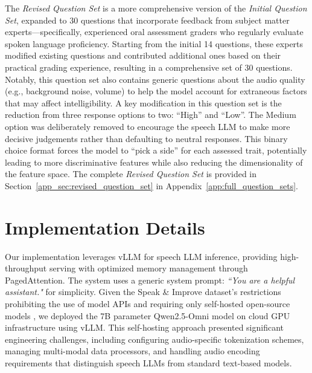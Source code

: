 \documentclass{report}
\begin{document}
The \emph{Revised Question Set} is a more comprehensive version of the \emph{Initial Question Set}, expanded to 30 questions that incorporate feedback from subject matter experts—specifically, experienced oral assessment graders who regularly evaluate spoken language proficiency. Starting from the initial 14 questions, these experts modified existing questions and contributed additional ones based on their practical grading experience, resulting in a comprehensive set of 30 questions. Notably, this question set also contains generic questions about the audio quality (e.g., background noise, volume) to help the model account for extraneous factors that may affect intelligibility. A key modification in this question set is the reduction from three response options to two: ``High'' and ``Low''. The Medium option was deliberately removed to encourage the speech LLM to make more decisive judgements rather than defaulting to neutral responses. This binary choice format forces the model to ``pick a side'' for each assessed trait, potentially leading to more discriminative features while also reducing the dimensionality of the feature space. The complete \emph{Revised Question Set} is provided in Section~\ref{app_sec:revised_question_set} in Appendix~\ref{app:full_question_sets}.

\section{Implementation Details}
\label{sec:implementation_details}
Our implementation leverages vLLM \citep{kwon2023efficientmemorymanagementlarge} for speech LLM inference, providing high-throughput serving with optimized memory management through PagedAttention. The system uses a generic system prompt: \emph{``You are a helpful assistant."} for simplicity. Given the Speak \& Improve dataset's restrictions prohibiting the use of model APIs and requiring only self-hosted open-source models \citep{knill2024sandi}, we deployed the 7B parameter Qwen2.5-Omni model on cloud GPU infrastructure using vLLM. This self-hosting approach presented significant engineering challenges, including configuring audio-specific tokenization schemes, managing multi-modal data processors, and handling audio encoding requirements that distinguish speech LLMs from standard text-based models.
\end{document}
